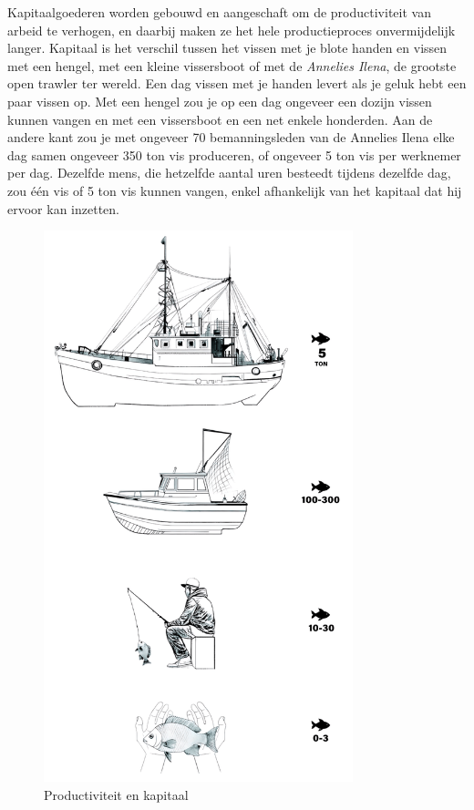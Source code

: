 Kapitaalgoederen worden gebouwd en aangeschaft om de productiviteit van arbeid te verhogen, en daarbij maken ze het hele productieproces onvermijdelijk langer. Kapitaal is het verschil tussen het vissen met je blote handen en vissen met een hengel, met een kleine vissersboot of met de \emph{Annelies Ilena}, de grootste open trawler ter wereld. Een dag vissen met je handen levert als je geluk hebt een paar vissen op. Met een hengel zou je op een dag ongeveer een dozijn vissen kunnen vangen en met een vissersboot en een net enkele honderden. Aan de andere kant zou je met ongeveer 70 bemanningsleden van de Annelies Ilena elke dag samen ongeveer 350 ton vis produceren, of ongeveer 5 ton vis per werknemer per dag. Dezelfde mens, die hetzelfde aantal uren besteedt tijdens dezelfde dag, zou één vis of 5 ton vis kunnen vangen, enkel afhankelijk van het kapitaal dat hij ervoor kan inzetten.

\begin{figure}[]
    \centering
    \includegraphics[width=0.8\textwidth]{figures/fig8-1.png}
    \caption[Productiviteit en kapitaal]{Productiviteit en kapitaal}
    \label{fig8}
\end{figure}

